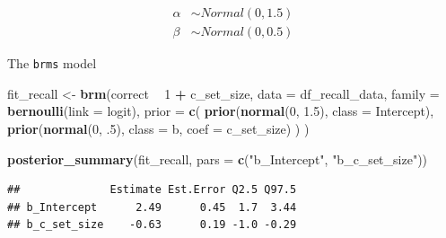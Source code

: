 \documentclass[12pt,ignorenonframetext,aspectratio=169]{beamer}
\newenvironment{Shaded}{\begin{snugshade}}{\end{snugshade}}
\newcommand{\DataTypeTok}[1]{\textcolor[rgb]{0.13,0.29,0.53}{#1}}
\newcommand{\DecValTok}[1]{\textcolor[rgb]{0.00,0.00,0.81}{#1}}
\newcommand{\FloatTok}[1]{\textcolor[rgb]{0.00,0.00,0.81}{#1}}
\newcommand{\KeywordTok}[1]{\textcolor[rgb]{0.13,0.29,0.53}{\textbf{#1}}}
\newcommand{\NormalTok}[1]{#1}
\newcommand{\OperatorTok}[1]{\textcolor[rgb]{0.81,0.36,0.00}{\textbf{#1}}}
\newcommand{\StringTok}[1]{\textcolor[rgb]{0.31,0.60,0.02}{#1}}
\begin{document}
\begin{frame}

\begin{equation}
\begin{aligned}
\alpha &\sim Normal(0, 1.5) \\
\beta &\sim Normal(0, 0.5) 
\end{aligned}
\end{equation}

\end{frame}

\begin{frame}[fragile]{The \texttt{brms} model}
\protect\hypertarget{the-brms-model}{}

\small

\begin{Shaded}
\begin{Highlighting}[]
\NormalTok{fit_recall <-}\StringTok{ }\KeywordTok{brm}\NormalTok{(correct }\OperatorTok{~}\StringTok{ }\DecValTok{1} \OperatorTok{+}\StringTok{ }\NormalTok{c_set_size,}
  \DataTypeTok{data =}\NormalTok{ df_recall_data,}
  \DataTypeTok{family =} \KeywordTok{bernoulli}\NormalTok{(}\DataTypeTok{link =}\NormalTok{ logit),}
  \DataTypeTok{prior =} \KeywordTok{c}\NormalTok{(}
    \KeywordTok{prior}\NormalTok{(}\KeywordTok{normal}\NormalTok{(}\DecValTok{0}\NormalTok{, }\FloatTok{1.5}\NormalTok{), }\DataTypeTok{class =}\NormalTok{ Intercept),}
    \KeywordTok{prior}\NormalTok{(}\KeywordTok{normal}\NormalTok{(}\DecValTok{0}\NormalTok{, }\FloatTok{.5}\NormalTok{), }\DataTypeTok{class =}\NormalTok{ b, }\DataTypeTok{coef =}\NormalTok{ c_set_size)}
\NormalTok{  )}
\NormalTok{)}
\end{Highlighting}
\end{Shaded}

\normalsize

\end{frame}

\begin{frame}[fragile]

\small

\begin{Shaded}
\begin{Highlighting}[]
\KeywordTok{posterior_summary}\NormalTok{(fit_recall, }\DataTypeTok{pars =} \KeywordTok{c}\NormalTok{(}\StringTok{"b_Intercept"}\NormalTok{, }\StringTok{"b_c_set_size"}\NormalTok{))}
\end{Highlighting}
\end{Shaded}

\begin{verbatim}
##              Estimate Est.Error Q2.5 Q97.5
## b_Intercept      2.49      0.45  1.7  3.44
## b_c_set_size    -0.63      0.19 -1.0 -0.29
\end{verbatim}

\normalsize

\end{frame}
\end{document}
